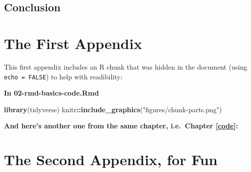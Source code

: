 \documentclass[a4paper, twoside]{templates/ociamthesis}
\newenvironment{Shaded}{\begin{snugshade}}{\end{snugshade}}
\newcommand{\KeywordTok}[1]{\textcolor[rgb]{0.13,0.29,0.53}{\textbf{#1}}}
\newcommand{\NormalTok}[1]{#1}
\newcommand{\OperatorTok}[1]{\textcolor[rgb]{0.81,0.36,0.00}{\textbf{#1}}}
\newcommand{\StringTok}[1]{\textcolor[rgb]{0.31,0.60,0.02}{#1}}
\renewenvironment{Shaded}
{
  \vspace{4pt}%
  \begin{snugshade}%
}{%
  \end{snugshade}%
  \vspace{4pt}%
}
\newcommand*{\bibtitle}{Works Cited}
\begin{document}
\hypertarget{conclusion-3}{%
\section*{Conclusion}\label{conclusion-3}}

\startappendices

\hypertarget{the-first-appendix}{%
\chapter{The First Appendix}\label{the-first-appendix}}

This first appendix includes an R chunk that was hidden in the document (using \texttt{echo\ =\ FALSE}) to help with readibility:

\textbf{In 02-rmd-basics-code.Rmd}

\begin{Shaded}
\begin{Highlighting}[]
\KeywordTok{library}\NormalTok{(tidyverse)}
\NormalTok{knitr}\OperatorTok{::}\KeywordTok{include\_graphics}\NormalTok{(}\StringTok{"figures/chunk{-}parts.png"}\NormalTok{)}
\end{Highlighting}
\end{Shaded}

\textbf{And here's another one from the same chapter, i.e.~Chapter \ref{code}:}

\hypertarget{the-second-appendix-for-fun}{%
\chapter{The Second Appendix, for Fun}\label{the-second-appendix-for-fun}}




\setlength{\baselineskip}{0pt} %

{\renewcommand*\MakeUppercase[1]{#1}%
\printbibliography[heading=bibintoc,title={\bibtitle}]}
\end{document}
